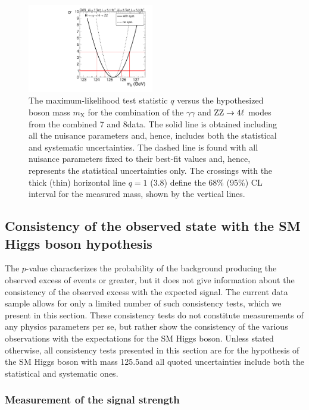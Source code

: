 \documentclass[11pt,twoside,a4paper,cmspaper,final,collab]{cms-tdr}
\begin{document}
\begin{figure}[thbp]
\centering
\includegraphics[width=0.49\textwidth]{figures/comb/sqr_mass_scan_1d_hires_comp}
\caption{
The maximum-likelihood test statistic $q$ versus the  hypothesized boson mass $m_{\mathrm{X}}$
for the combination of the $\gamma \gamma$ and  $\mathrm{Z}\mathrm{Z} \to 4\ell$
modes  from the combined 7 and 8\TeV data.
The solid line is obtained including all the nuisance parameters
and, hence, includes both the statistical and systematic uncertainties.
The dashed line is found with all nuisance parameters fixed to their best-fit values
and, hence, represents the statistical uncertainties only.
The crossings with the thick (thin) horizontal line $q=1$ (3.8) define the 68\% (95\%) CL interval
for the measured mass, shown by the vertical lines.
}
\label{fig:fit_mass_statsyst}
\end{figure}



\subsection{Consistency of the observed state with the SM Higgs boson hypothesis}


The $p$-value characterizes the probability of the background
producing the observed excess of events or greater, but
it does not give information about the consistency of the observed excess
with the expected signal. The current
data sample allows for only a limited number of such consistency tests, which we present in this section.
These consistency tests do not constitute measurements of any physics parameters per se, but rather
show the consistency of the various observations with the expectations for the SM Higgs boson.
Unless stated otherwise, all consistency tests presented in this section are for the hypothesis of the
SM Higgs boson with mass 125.5\GeV and all quoted uncertainties include both the statistical and systematic ones.

\subsubsection{Measurement of the signal strength}
\end{document}
